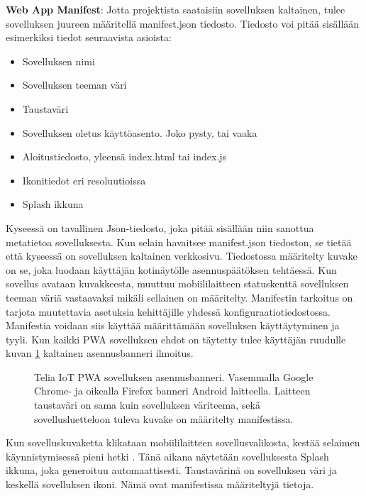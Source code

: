 \documentclass{tktltiki}
\begin{document}
\textbf{Web App Manifest}: Jotta projektista saataisiin sovelluksen kaltainen, tulee sovelluksen juureen määritellä manifest.json tiedosto. Tiedosto voi pitää sisällään esimerkiksi tiedot seuraavista asioista:

\begin{itemize}
  \item Sovelluksen nimi
  \item Sovelluksen teeman väri
  \item Taustaväri
  \item Sovelluksen oletus käyttöasento. Joko pysty, tai vaaka
  \item Aloitustiedosto, yleensä index.html tai index.js
  \item Ikonitiedot eri resoluutioissa
  \item Splash ikkuna
\end{itemize}

Kyseessä on tavallinen Json-tiedosto, joka pitää sisällään niin sanottua metatietoa sovelluksesta. Kun selain havaitsee manifest.json tiedoston, se tietää että kyseessä on sovelluksen kaltainen verkkosivu. Tiedostossa määritelty kuvake on se, joka luodaan käyttäjän kotinäytölle asennuspäätöksen tehtäessä. Kun sovellus avataan kuvakkeesta, muuttuu mobiililaitteen statuskenttä sovelluksen teeman väriä vastaavaksi mikäli sellainen on määritelty. Manifestin tarkoitus on tarjota muutettavia asetuksia kehittäjille yhdessä konfiguraatiotiedostossa. \cite{biorn2017progressive} Manifestia voidaan siis käyttää määrittämään sovelluksen käyttäytyminen ja tyyli. Kun kaikki PWA sovelluksen ehdot on täytetty tulee käyttäjän ruudulle kuvan \ref{asennusbanneri} kaltainen asennusbanneri ilmoitus.

\begin{figure}[!ht]
\begin{center}
\caption{Telia IoT PWA sovelluksen asennusbanneri. Vasemmalla Google Chrome- ja oikealla Firefox banneri Android laitteella. Laitteen taustaväri on sama kuin sovelluksen väriteema, sekä sovellusluetteloon tuleva kuvake on määritelty manifestissa.}
\label{asennusbanneri}
\end{center}
\end{figure}

Kun sovelluskuvaketta klikataan mobiililaitteen sovellusvalikosta, kestää selaimen käynnistymisessä pieni hetki \cite{hiltunen2018creating}. Tänä aikana näytetään sovelluksesta Splash ikkuna, joka generoituu automaattisesti. Taustavärinä on sovelluksen väri ja keskellä sovelluksen ikoni. Nämä ovat manifestissa määriteltyjä tietoja.
\end{document}
